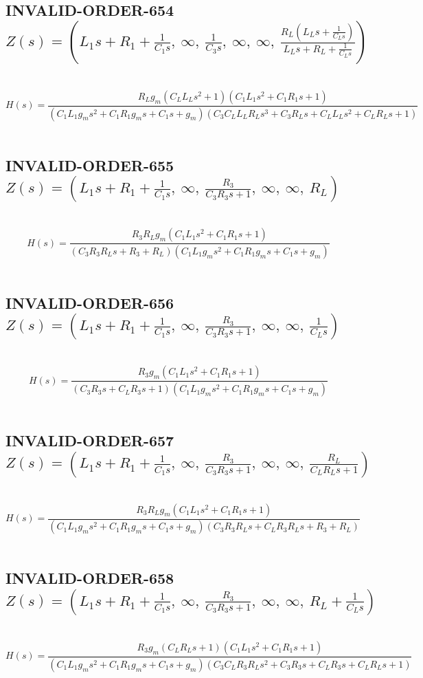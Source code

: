 \documentclass{article}
\begin{document}
\subsection{INVALID-ORDER-654 $Z(s) = \left( L_{1} s + R_{1} + \frac{1}{C_{1} s}, \  \infty, \  \frac{1}{C_{3} s}, \  \infty, \  \infty, \  \frac{R_{L} \left(L_{L} s + \frac{1}{C_{L} s}\right)}{L_{L} s + R_{L} + \frac{1}{C_{L} s}}\right)$ } \ 
\textbf{\[H(s) = \frac{R_{L} g_{m} \left(C_{L} L_{L} s^{2} + 1\right) \left(C_{1} L_{1} s^{2} + C_{1} R_{1} s + 1\right)}{\left(C_{1} L_{1} g_{m} s^{2} + C_{1} R_{1} g_{m} s + C_{1} s + g_{m}\right) \left(C_{3} C_{L} L_{L} R_{L} s^{3} + C_{3} R_{L} s + C_{L} L_{L} s^{2} + C_{L} R_{L} s + 1\right)}\] } \ 
\subsection{INVALID-ORDER-655 $Z(s) = \left( L_{1} s + R_{1} + \frac{1}{C_{1} s}, \  \infty, \  \frac{R_{3}}{C_{3} R_{3} s + 1}, \  \infty, \  \infty, \  R_{L}\right)$ } \ 
\textbf{\[H(s) = \frac{R_{3} R_{L} g_{m} \left(C_{1} L_{1} s^{2} + C_{1} R_{1} s + 1\right)}{\left(C_{3} R_{3} R_{L} s + R_{3} + R_{L}\right) \left(C_{1} L_{1} g_{m} s^{2} + C_{1} R_{1} g_{m} s + C_{1} s + g_{m}\right)}\] } \ 
\subsection{INVALID-ORDER-656 $Z(s) = \left( L_{1} s + R_{1} + \frac{1}{C_{1} s}, \  \infty, \  \frac{R_{3}}{C_{3} R_{3} s + 1}, \  \infty, \  \infty, \  \frac{1}{C_{L} s}\right)$ } \ 
\textbf{\[H(s) = \frac{R_{3} g_{m} \left(C_{1} L_{1} s^{2} + C_{1} R_{1} s + 1\right)}{\left(C_{3} R_{3} s + C_{L} R_{3} s + 1\right) \left(C_{1} L_{1} g_{m} s^{2} + C_{1} R_{1} g_{m} s + C_{1} s + g_{m}\right)}\] } \ 
\subsection{INVALID-ORDER-657 $Z(s) = \left( L_{1} s + R_{1} + \frac{1}{C_{1} s}, \  \infty, \  \frac{R_{3}}{C_{3} R_{3} s + 1}, \  \infty, \  \infty, \  \frac{R_{L}}{C_{L} R_{L} s + 1}\right)$ } \ 
\textbf{\[H(s) = \frac{R_{3} R_{L} g_{m} \left(C_{1} L_{1} s^{2} + C_{1} R_{1} s + 1\right)}{\left(C_{1} L_{1} g_{m} s^{2} + C_{1} R_{1} g_{m} s + C_{1} s + g_{m}\right) \left(C_{3} R_{3} R_{L} s + C_{L} R_{3} R_{L} s + R_{3} + R_{L}\right)}\] } \ 
\subsection{INVALID-ORDER-658 $Z(s) = \left( L_{1} s + R_{1} + \frac{1}{C_{1} s}, \  \infty, \  \frac{R_{3}}{C_{3} R_{3} s + 1}, \  \infty, \  \infty, \  R_{L} + \frac{1}{C_{L} s}\right)$ } \ 
\textbf{\[H(s) = \frac{R_{3} g_{m} \left(C_{L} R_{L} s + 1\right) \left(C_{1} L_{1} s^{2} + C_{1} R_{1} s + 1\right)}{\left(C_{1} L_{1} g_{m} s^{2} + C_{1} R_{1} g_{m} s + C_{1} s + g_{m}\right) \left(C_{3} C_{L} R_{3} R_{L} s^{2} + C_{3} R_{3} s + C_{L} R_{3} s + C_{L} R_{L} s + 1\right)}\] } \ 
\end{document}
